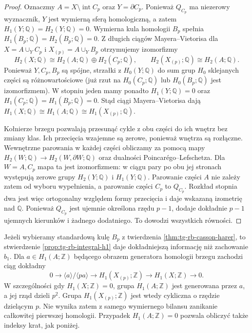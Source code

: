 \begin{proof}
Oznaczmy $A=X\setminus\operatorname{int}C_p$
oraz $Y=\partial C_p$. Ponieważ $Q_{C_p}$
ma niezerowy wyznacznik, $Y$ jest
wymierną sferą homologiczną, a zatem
$H_1(Y;\mathbb Q)=H_2(Y;\mathbb Q)=0$.
Wymierna kula homologii $B_p$
spełnia $H_1(B_p;\mathbb Q)
=H_2(B_p;\mathbb Q)=0$.
Z długich ciągów Mayera--Vietorisa
dla $X=A\cup_YC_p$ i
$X_{(p)}=A\cup_YB_p$
otrzymujemy izomorfizmy
\[
 H_2(X;\mathbb Q)\cong
 H_2(A;\mathbb Q)\oplus H_2(C_p;\mathbb Q),
 \qquad H_2(X_{(p)};\mathbb Q)
 \cong H_2(A;\mathbb Q).
\]
Ponieważ $Y,C_p,B_p$ są spójne, strzałki
z $H_0(Y;\mathbb Q)$ do sum grup $H_0$
sklejanych części są różnowartościowe (już rzut na
$H_0(C_p;\mathbb Q)$ lub $H_0(B_p;\mathbb Q)$
jest izomorfizmem). W stopniu jeden mamy
ponadto $H_1(Y;\mathbb Q)=0$ oraz
$H_1(C_p;\mathbb Q)=H_1(B_p;\mathbb Q)=0$.
Stąd ciągi Mayera--Vietorisa dają $H_1(X;\mathbb Q)\cong
H_1(A;\mathbb Q)
\cong H_1(X_{(p)};\mathbb Q)$.

Kołnierze brzegu pozwalają przesunąć cykle
z obu części do ich wnętrz bez zmiany klas.
Ich przecięcia wzajemne są zerowe, ponieważ
wnętrza są rozłączne. Wewnętrzne parowania
w każdej części obliczamy za pomocą mapy
$H_2(W;\mathbb Q)\to H_2(W,\partial W;\mathbb Q)$
oraz dualności Poincarégo--Lefschetza.
Dla $W=A,C_p$ mapa ta jest izomorfizmem:
w ciągu pary po obu jej stronach występują
zerowe grupy $H_2(Y;\mathbb Q)$ i $H_1(Y;\mathbb Q)$.
Parowanie części $A$ nie zależy zatem od wyboru
wypełnienia, a parowanie części $C_p$ to $Q_{C_p}$.
Rozkład stopnia dwa jest więc
ortogonalny względem formy
przecięcia i daje wskazaną
izometrię nad $\mathbb Q$.
Ponieważ $Q_{C_p}$ jest ujemnie
określona rzędu $p-1$,
dodaje dokładnie $p-1$ ujemnych
kierunków i żadnego dodatniego.
To dowodzi wszystkich równości.
\end{proof}

\begin{uwaga}
Jeżeli wybieramy standardową kulę $B_p$
z twierdzenia \ref{thm:tg-rb-casson-harer},
to stwierdzenie \ref{prop:tg-rb-integral-h1}
daje dokładniejszą informację niż zachowanie $b_1$.
Dla $a\in H_1(A;\mathbb Z)$ będącego obrazem
generatora homologii brzegu zachodzi ciąg dokładny
\[
0\longrightarrow
\langle a\rangle/\langle pa\rangle
\longrightarrow H_1(X_{(p)};\mathbb Z)
\longrightarrow H_1(X;\mathbb Z)
\longrightarrow0.
\]
W szczególności gdy $H_1(X;\mathbb Z)=0$,
grupa $H_1(A;\mathbb Z)$ jest generowana przez $a$,
a jej rząd dzieli $p^2$. Grupa $H_1(X_{(p)};\mathbb Z)$
jest wtedy cykliczna o rzędzie dzielącym $p$.
Nie wynika zatem z samego wymiernego bilansu
zanikanie całkowitej pierwszej homologii.
Przypadek $H_1(A;\mathbb Z)=0$ pozwala obliczyć
także indeksy krat, jak poniżej.
\end{uwaga}

